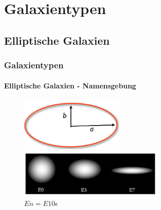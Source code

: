 \section{Galaxientypen}

\subsection{Elliptische Galaxien}

\begin{frame}
\frametitle{Galaxientypen}
\framesubtitle{Elliptische Galaxien - Namensgebung}



\begin{figure}
\begin{minipage}[hbt]{5cm}
	\centering
	\includegraphics[width=5cm]{Ellipse_Exzentri.png}
	\caption{$\epsilon = 1 - b/a$}
\end{minipage}
\hfill
\begin{minipage}[hbt]{7cm}
	\centering
	\includegraphics[width=7cm]{Ellipse_Exzentri2.png}
	\caption{$En = E 10\epsilon$}
\end{minipage}
\end{figure}

\end{frame}


